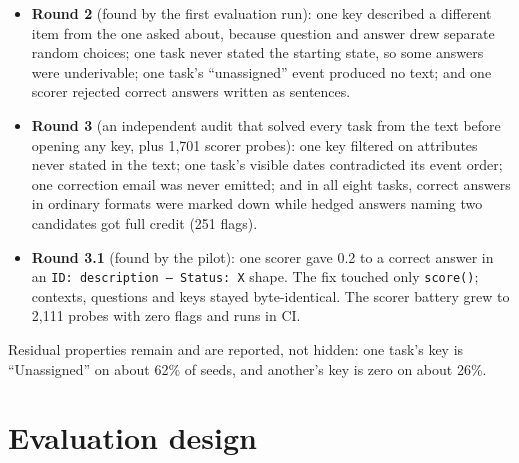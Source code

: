 \documentclass[11pt]{article}
\newcommand{\code}[1]{\texttt{#1}}
\begin{document}
\begin{itemize}[leftmargin=*]
\item \textbf{Round 2} (found by the first evaluation run): one key described a
  different item from the one asked about, because question and answer drew
  separate random choices; one task never stated the starting state, so some
  answers were underivable; one task's ``unassigned'' event produced no text; and
  one scorer rejected correct answers written as sentences.
\item \textbf{Round 3} (an independent audit that solved every task from the text
  before opening any key, plus 1,701 scorer probes): one key filtered on attributes
  never stated in the text; one task's visible dates contradicted its event order;
  one correction email was never emitted; and in all eight tasks, correct answers in
  ordinary formats were marked down while hedged answers naming two candidates got
  full credit (251 flags).
\item \textbf{Round 3.1} (found by the pilot): one scorer gave 0.2 to a correct
  answer in an \code{ID: description --- Status: X} shape. The fix touched only
  \code{score()}; contexts, questions and keys stayed byte-identical. The scorer
  battery grew to 2,111 probes with zero flags and runs in CI.
\end{itemize}

Residual properties remain and are reported, not hidden: one task's key is
``Unassigned'' on about 62\% of seeds, and another's key is zero on about 26\%.

\section{Evaluation design}
\label{sec:design}
\end{document}

